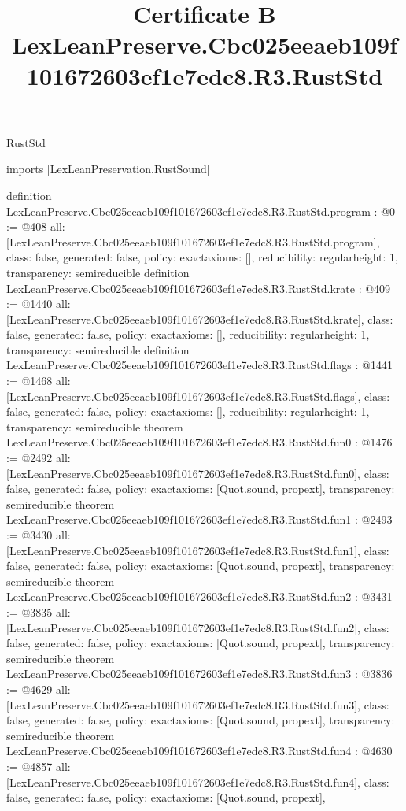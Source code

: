 \begin{lexlean}{RustStd}
\title{Certificate B LexLeanPreserve.Cbc025eeaeb109f101672603ef1e7edc8.R3.RustStd}
\begin{coremodule}
imports [LexLeanPreservation.RustSound]

definition LexLeanPreserve.Cbc025eeaeb109f101672603ef1e7edc8.R3.RustStd.program : @0 := @408 {
  all: [LexLeanPreserve.Cbc025eeaeb109f101672603ef1e7edc8.R3.RustStd.program],
  class: false,
  generated: false,
  policy: exact{axioms: []},
  reducibility: regular{height: 1},
  transparency: semireducible
}
definition LexLeanPreserve.Cbc025eeaeb109f101672603ef1e7edc8.R3.RustStd.krate : @409 := @1440 {
  all: [LexLeanPreserve.Cbc025eeaeb109f101672603ef1e7edc8.R3.RustStd.krate],
  class: false,
  generated: false,
  policy: exact{axioms: []},
  reducibility: regular{height: 1},
  transparency: semireducible
}
definition LexLeanPreserve.Cbc025eeaeb109f101672603ef1e7edc8.R3.RustStd.flags : @1441 := @1468 {
  all: [LexLeanPreserve.Cbc025eeaeb109f101672603ef1e7edc8.R3.RustStd.flags],
  class: false,
  generated: false,
  policy: exact{axioms: []},
  reducibility: regular{height: 1},
  transparency: semireducible
}
theorem LexLeanPreserve.Cbc025eeaeb109f101672603ef1e7edc8.R3.RustStd.fun0 : @1476 := @2492 {
  all: [LexLeanPreserve.Cbc025eeaeb109f101672603ef1e7edc8.R3.RustStd.fun0],
  class: false,
  generated: false,
  policy: exact{axioms: [Quot.sound, propext]},
  transparency: semireducible
}
theorem LexLeanPreserve.Cbc025eeaeb109f101672603ef1e7edc8.R3.RustStd.fun1 : @2493 := @3430 {
  all: [LexLeanPreserve.Cbc025eeaeb109f101672603ef1e7edc8.R3.RustStd.fun1],
  class: false,
  generated: false,
  policy: exact{axioms: [Quot.sound, propext]},
  transparency: semireducible
}
theorem LexLeanPreserve.Cbc025eeaeb109f101672603ef1e7edc8.R3.RustStd.fun2 : @3431 := @3835 {
  all: [LexLeanPreserve.Cbc025eeaeb109f101672603ef1e7edc8.R3.RustStd.fun2],
  class: false,
  generated: false,
  policy: exact{axioms: [Quot.sound, propext]},
  transparency: semireducible
}
theorem LexLeanPreserve.Cbc025eeaeb109f101672603ef1e7edc8.R3.RustStd.fun3 : @3836 := @4629 {
  all: [LexLeanPreserve.Cbc025eeaeb109f101672603ef1e7edc8.R3.RustStd.fun3],
  class: false,
  generated: false,
  policy: exact{axioms: [Quot.sound, propext]},
  transparency: semireducible
}
theorem LexLeanPreserve.Cbc025eeaeb109f101672603ef1e7edc8.R3.RustStd.fun4 : @4630 := @4857 {
  all: [LexLeanPreserve.Cbc025eeaeb109f101672603ef1e7edc8.R3.RustStd.fun4],
  class: false,
  generated: false,
  policy: exact{axioms: [Quot.sound, propext]},
}
\end{coremodule}
\end{lexlean}
